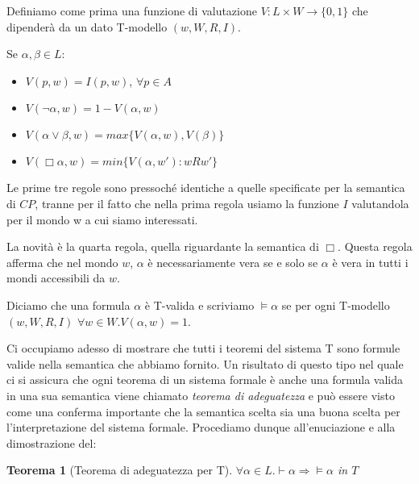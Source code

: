 \documentclass[a4paper, titlepage, 12pt]{report}
\newtheorem{theorem}{Teorema}[chapter]
\begin{document}
Definiamo come prima una funzione di valutazione $V : L \times W \to \{0, 1\}$ che dipenderà da un dato T-modello
$(w, W, R, I)$.

Se $\alpha, \beta \in L$:
\begin{itemize}
\item $V(p, w) = I(p, w)$, $\forall p \in A$
\item $V(\neg \alpha, w) = 1 - V(\alpha, w)$
\item $V(\alpha \vee \beta, w) = max\{V(\alpha, w), V(\beta)\}$
\item $V(\Box \alpha, w) = min\{ V(\alpha, w') : w R w' \}$
\end{itemize}

Le prime tre regole sono pressoché identiche a quelle specificate per la semantica di $CP$,
tranne per il fatto che nella prima regola usiamo la funzione $I$ valutandola per il mondo w
a cui siamo interessati.

La novità è la quarta regola, quella riguardante la semantica di $\Box$.
Questa regola afferma che nel mondo $w$, $\alpha$ è necessariamente vera se e solo se
$\alpha$ è vera in tutti i mondi accessibili da $w$.

Diciamo che una formula $\alpha$ è T-valida e scriviamo $\vDash \alpha$
se per ogni T-modello $(w, W, R, I)$ $\forall w \in W. V(\alpha, w) = 1$.

Ci occupiamo adesso di mostrare che tutti i teoremi del sistema T sono formule valide
nella semantica che abbiamo fornito. Un risultato di questo tipo nel quale
ci si assicura che ogni teorema di un sistema formale è anche una formula
valida in una sua semantica viene chiamato
\emph{teorema di adeguatezza} e può essere visto come una conferma
importante che la semantica scelta sia una buona scelta per l'interpretazione
del sistema formale.
Procediamo dunque all'enuciazione e alla dimostrazione del:

\begin{theorem}[Teorema di adeguatezza per T]
$\forall \alpha \in L. \vdash \alpha \Rightarrow \vDash \alpha$ in $T$
\end{theorem}
\end{document}
